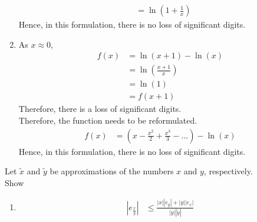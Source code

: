 \documentclass[fleqn, a4paper, 11pt, oneside]{amsart}
\theoremstyle{definition}
\theoremstyle{theorem}
\begin{document}
\begin{solution}
\begin{enumerate}[leftmargin=*]
\begin{align*}
                                     & = \ln\left( 1 + \frac{1}{x} \right)
			\end{align*}
			Hence, in this formulation, there is no loss of significant digits.
		\item
			As $x \approx 0$,
			\begin{align*}
				f(x) & = \ln(x + 1) - \ln(x)               \\
                                     & = \ln\left( \frac{x + 1}{x} \right) \\
                                     & = \ln(1)                            \\
                                     & = f(x + 1)
			\end{align*}
			Therefore, there is a loss of significant digits.\\
			Therefore, the function needs to be reformulated.
			\begin{align*}
				f(x) & = \left( x - \frac{x^2}{2} + \frac{x^3}{3} - \dots \right) - \ln(x)
			\end{align*}
			Hence, in this formulation, there is no loss of significant digits.
	\end{enumerate}
\end{solution}

\begin{question}
	Let $\tilde{x}$ and $\tilde{y}$ be approximations of the numbers $x$ and $y$, respectively.\\
	Show
	\begin{enumerate}
		\item
			\begin{align*}
				\left| e_{\frac{x}{y}} \right| & \le \frac{|x| |e_y| + |y| |e_x|}{|y| |\tilde{y}|}
			\end{align*}
	\end{enumerate}
\end{question}
\end{document}
